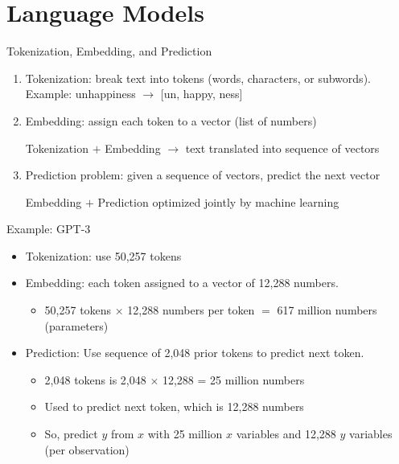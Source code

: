 \documentclass[10pt]{beamer}
\begin{document}
\section{Language Models}

\begin{frame}{Tokenization, Embedding, and Prediction}
    \begin{enumerate}
        \item Tokenization: break text into tokens (words, characters, or subwords). Example: unhappiness $\rightarrow$ [un, happy, ness]
        \item Embedding: assign each token to a vector (list of numbers)
        \vspace{1em}
    \begin{center}
       \alert{Tokenization $+$ Embedding $\rightarrow$ text translated into sequence of vectors}
        \end{center}   \vspace{1em}
        \item Prediction problem:
        given a sequence of vectors, predict the next vector
        \vspace{1em}
        \begin{center} \alert{Embedding $+$ Prediction optimized jointly by machine learning} \end{center}
    \end{enumerate}
\end{frame}


\begin{frame}{Example: GPT-3}
    \begin{itemize}
        \item Tokenization: use 50,257 tokens
        \item Embedding: each token assigned to a vector of 12,288 numbers. 
        \begin{itemize}
        \item 50,257 tokens $\times$ 12,288 numbers per token $=$ 617 million numbers (parameters)
        \end{itemize}
        \item Prediction: Use sequence of 2,048 prior tokens to predict next token.
        \vspace{-1em}
        \begin{itemize}
        \item 2,048 tokens is 2,048 $\times$ 12,288 = 25 million numbers 
        \item Used to predict next token, which is 
        12,288 numbers
        \item So, predict $y$ from $x$ with 25 million $x$ variables and 12,288 $y$ variables (per observation)
        \end{itemize}
    \end{itemize}
\end{frame}
\end{document}
